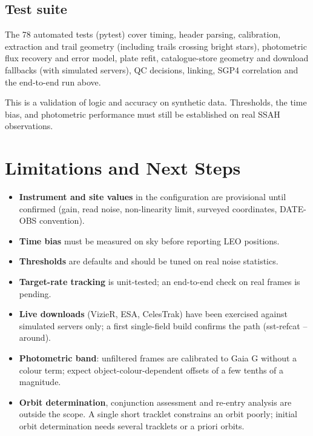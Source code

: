\documentclass[11pt,a4paper]{article}
\newcommand{\brkus}{\textunderscore\allowbreak}
\newcommand{\code}[1]{{\ttfamily\let\_\brkus #1}}
\begin{document}
\subsection{Test suite}
The 78 automated tests (\code{pytest}) cover timing, header parsing, calibration, extraction and
trail geometry (including trails crossing bright stars), photometric flux recovery and error
model, plate refit, catalogue-store geometry and download fallbacks (with simulated servers),
QC decisions, linking, SGP4 correlation and the end-to-end run above.

\begin{notebox}
This is a validation of logic and accuracy on synthetic data. Thresholds, the time bias, and
photometric performance must still be established on real SSAH observations.
\end{notebox}

\section{Limitations and Next Steps}

\begin{itemize}
\item \textbf{Instrument and site values} in the configuration are provisional until confirmed
      (gain, read noise, non-linearity limit, surveyed coordinates, DATE-OBS convention).
\item \textbf{Time bias} must be measured on sky before reporting LEO positions.
\item \textbf{Thresholds} are defaults and should be tuned on real noise statistics.
\item \textbf{Target-rate tracking} is unit-tested; an end-to-end check on real frames is pending.
\item \textbf{Live downloads} (VizieR, ESA, CelesTrak) have been exercised against simulated servers
      only; a first single-field build confirms the path (\code{sst-refcat --around}).
\item \textbf{Photometric band}: unfiltered frames are calibrated to Gaia G without a colour term;
      expect object-colour-dependent offsets of a few tenths of a magnitude.
\item \textbf{Orbit determination}, conjunction assessment and re-entry analysis are outside the
      scope. A single short tracklet constrains an orbit poorly; initial orbit determination needs
      several tracklets or a priori orbits.
\end{itemize}
\end{document}
